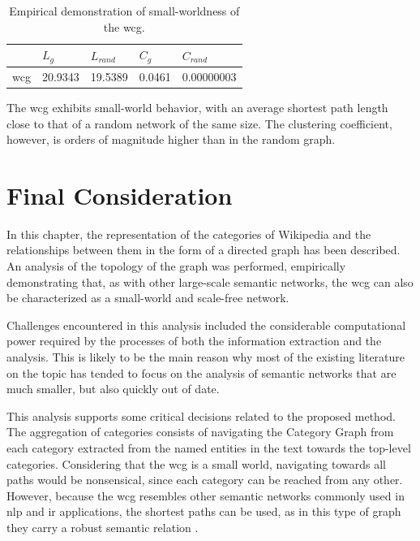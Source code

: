 \begin{table}[!h]
\centering
\caption{Empirical demonstration of small-worldness of the \gls{wcg}. }
\begin{tabular}{@{}lllll@{}}
\toprule
    & $L_g$       & $L_{rand}$       & $C_{g}$           & $C_{rand}$        \\ \midrule
\gls{wcg} & 20.9343 & 19.5389 & 0.0461 & 0.00000003 \\ \bottomrule
\end{tabular}

\label{small-worldness}
\end{table}

The \gls{wcg} exhibits small-world behavior, with an average shortest path length close to that of a random network of the same size. The clustering coefficient, however, is orders of magnitude higher than in the random graph.  


\section{\hspace*{3pt} Final Consideration}

In this chapter, the representation of the categories of Wikipedia and the relationships between them in the form of a directed graph has been described. An analysis of the topology of the graph was performed, empirically demonstrating that, as with other large-scale semantic networks, the \gls{wcg} can also be characterized as a small-world and scale-free network.

Challenges encountered in this analysis included the considerable computational power required by the processes of both the information extraction and the analysis. This is likely to be the main reason why most of the existing literature on the topic has tended to focus on the analysis of semantic networks that are much smaller, but also quickly out of date.

This analysis supports some critical decisions related to the proposed method. The aggregation of categories consists of navigating the Category Graph from each category extracted from the named entities in the text towards the top-level categories. 
Considering that the \gls{wcg} is a small world, navigating towards all paths would be nonsensical, since each category can be reached from any other. However, because the \gls{wcg} resembles other semantic networks commonly used in \gls{nlp} and \gls{ir}  applications, the shortest paths can be used,  as in this type of graph they carry a robust semantic relation \cite{mihalcea2011graph}.

